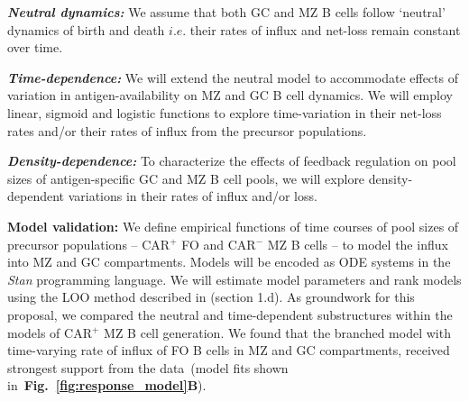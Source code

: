 \documentclass[11pt]{article}
\newcommand\ie{$\textit{i.e.}$}
\begin{document}
%
\textbf{\textit{Neutral dynamics:}}
We assume that both GC and MZ B cells follow `neutral' dynamics of birth and death {\ie} their  rates of influx and net-loss remain constant over time. 

\textbf{\textit{Time-dependence:}}
We will extend the neutral model to accommodate effects of variation in antigen-availability on MZ and GC B cell dynamics.
We will employ linear, sigmoid and logistic functions to explore time-variation in their net-loss rates  and/or their rates of influx from the precursor populations.

\textbf{\textit{Density-dependence:}}
To characterize the effects of feedback regulation on pool sizes of antigen-specific GC and MZ B cell pools, we will explore density-dependent variations in their rates of influx and/or loss.


\textbf{{Model validation:}}
We define empirical functions of time courses of pool sizes of precursor populations -- CAR$^+$ FO and CAR$^-$ MZ B cells --  to model the influx into MZ and GC compartments.
Models will be encoded as ODE systems in the \textit{Stan} programming language.
We will estimate model parameters and rank models using the LOO method described in (section 1.d).
As groundwork for this proposal, we compared the neutral and time-dependent substructures within the models of CAR$^+$ MZ B cell generation.
We found that the branched model with time-varying rate of influx of FO B cells in MZ and GC compartments, received strongest support from the data~(model fits shown in~\textbf{Fig.~\ref{fig:response_model}B}).  
\end{document}
